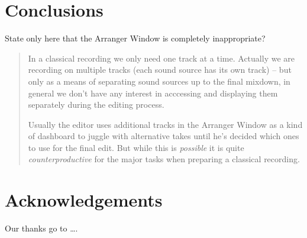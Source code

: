 \documentclass[11pt,a4paper]{article}
\begin{document}
\section{Conclusions}

State only here that the Arranger Window is completely inappropriate?

\begin{quote}


In a classical recording we only need one track at a time.
Actually we are recording on multiple tracks (each sound source has its own track) -- but only as a means of separating sound sources up to the final mixdown, in general we don't have any interest in acccessing and displaying them separately during the editing process.

Usually the editor uses additional tracks in the Arranger Window as a kind of dashboard to juggle with alternative takes until he's decided which ones to use for the final edit.
But while this is \emph{possible} it is quite \emph{counterproductive} for the major tasks when preparing a classical recording.
\end{quote}

\section{Acknowledgements}

Our thanks go to \ldots .
\end{document}
